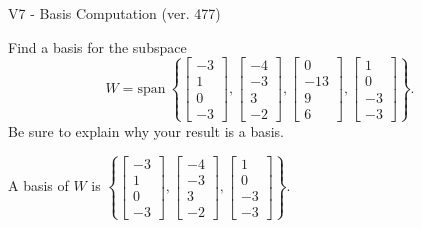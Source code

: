 \begin{exercise}
  \begin{exerciseTitle}V7 - Basis Computation (ver. 477)\end{exerciseTitle}
  \begin{exerciseStatement}
    Find a basis for the subspace 
\[W=\mathrm{span}\ \left\{\left[\begin{array}{r}
-3 \\
1 \\
0 \\
-3
\end{array}\right] , \left[\begin{array}{r}
-4 \\
-3 \\
3 \\
-2
\end{array}\right] , \left[\begin{array}{r}
0 \\
-13 \\
9 \\
6
\end{array}\right] , \left[\begin{array}{r}
1 \\
0 \\
-3 \\
-3
\end{array}\right]\right\}.\]
 Be sure to explain why your result is a basis.


  \end{exerciseStatement}
  \begin{exerciseAnswer}
   A basis of \(W\) is  \(\left\{\left[\begin{array}{r}
-3 \\
1 \\
0 \\
-3
\end{array}\right] , \left[\begin{array}{r}
-4 \\
-3 \\
3 \\
-2
\end{array}\right] , \left[\begin{array}{r}
1 \\
0 \\
-3 \\
-3
\end{array}\right]\right\}\).
  


  \end{exerciseAnswer}
\end{exercise}